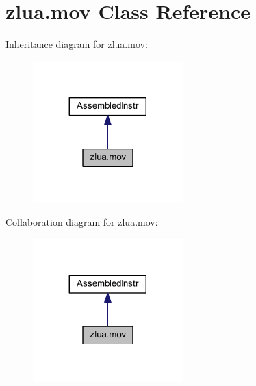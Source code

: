 \hypertarget{classzlua_1_1mov}{}\section{zlua.\+mov Class Reference}
\label{classzlua_1_1mov}


Inheritance diagram for zlua.\+mov\+:
\nopagebreak
\begin{figure}[H]
\begin{center}
\leavevmode
\includegraphics[width=164pt]{classzlua_1_1mov__inherit__graph}
\end{center}
\end{figure}


Collaboration diagram for zlua.\+mov\+:
\nopagebreak
\begin{figure}[H]
\begin{center}
\leavevmode
\includegraphics[width=164pt]{classzlua_1_1mov__coll__graph}
\end{center}
\end{figure}
